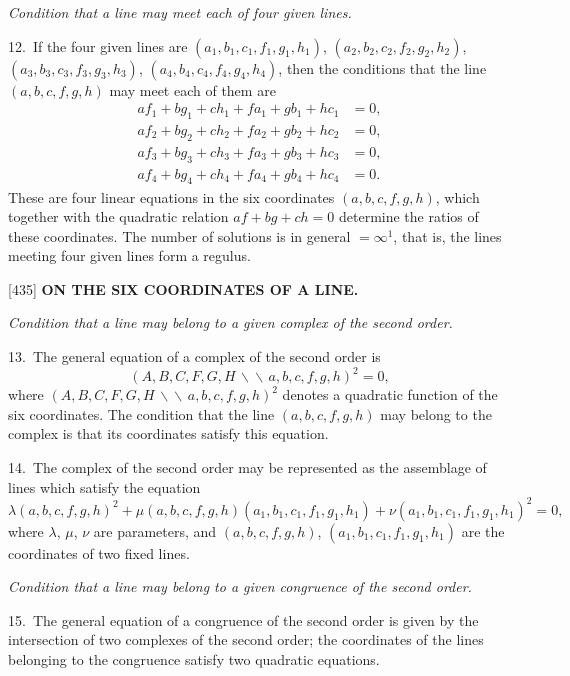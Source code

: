 \documentclass[12pt,a4paper]{article}
\newcommand{\paperref}[1]{\textup{[#1]}}
\theoremstyle{definition}
\begin{document}
\textit{Condition that a line may meet each of four given lines.}

12.~If the four given lines are $(a_1, b_1, c_1, f_1, g_1, h_1)$, $(a_2, b_2, c_2, f_2, g_2, h_2)$, $(a_3, b_3, c_3, f_3, g_3, h_3)$, $(a_4, b_4, c_4, f_4, g_4, h_4)$, then the conditions that the line $(a, b, c, f, g, h)$ may meet each of them are
\begin{align*}
a f_1 + b g_1 + c h_1 + f a_1 + g b_1 + h c_1 &= 0,\\
a f_2 + b g_2 + c h_2 + f a_2 + g b_2 + h c_2 &= 0,\\
a f_3 + b g_3 + c h_3 + f a_3 + g b_3 + h c_3 &= 0,\\
a f_4 + b g_4 + c h_4 + f a_4 + g b_4 + h c_4 &= 0.
\end{align*}
These are four linear equations in the six coordinates $(a, b, c, f, g, h)$, which together with the quadratic relation $af + bg + ch = 0$ determine the ratios of these coordinates. The number of solutions is in general $= \infty^1$, that is, the lines meeting four given lines form a regulus.

\newpage
\setcounter{page}{72}

\noindent\paperref{435}\quad
\textbf{ON THE SIX COORDINATES OF A LINE.}

\textit{Condition that a line may belong to a given complex of the second order.}

13.~The general equation of a complex of the second order is
\[
(A, B, C, F, G, H \,\backslash\!\!\backslash\, a, b, c, f, g, h)^2 = 0,
\]
where $(A, B, C, F, G, H \,\backslash\!\!\backslash\, a, b, c, f, g, h)^2$ denotes a quadratic function of the six coordinates. The condition that the line $(a, b, c, f, g, h)$ may belong to the complex is that its coordinates satisfy this equation.

14.~The complex of the second order may be represented as the assemblage of lines which satisfy the equation
\[
\lambda(a, b, c, f, g, h)^2 + \mu(a, b, c, f, g, h)(a_1, b_1, c_1, f_1, g_1, h_1) + \nu(a_1, b_1, c_1, f_1, g_1, h_1)^2 = 0,
\]
where $\lambda$, $\mu$, $\nu$ are parameters, and $(a, b, c, f, g, h)$, $(a_1, b_1, c_1, f_1, g_1, h_1)$ are the coordinates of two fixed lines.

\textit{Condition that a line may belong to a given congruence of the second order.}

15.~The general equation of a congruence of the second order is given by the intersection of two complexes of the second order; the coordinates of the lines belonging to the congruence satisfy two quadratic equations.
\end{document}
